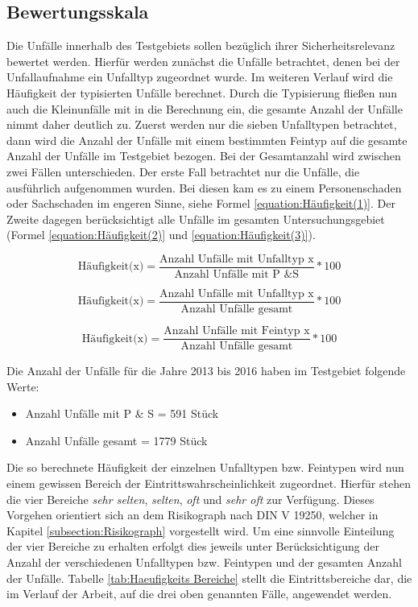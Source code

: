 \subsection{Bewertungsskala}\label{subsection:Bewertungsskala}
Die Unfälle innerhalb des Testgebiets sollen bezüglich ihrer Sicherheitsrelevanz bewertet werden. Hierfür werden zunächst die Unfälle betrachtet, denen bei der Unfallaufnahme ein Unfalltyp zugeordnet wurde. Im weiteren Verlauf wird die Häufigkeit der typisierten Unfälle berechnet. Durch die Typisierung fließen nun auch die Kleinunfälle mit in die Berechnung ein, die gesamte Anzahl der Unfälle nimmt daher deutlich zu. Zuerst werden nur die sieben Unfalltypen betrachtet, dann wird die Anzahl der Unfälle mit einem bestimmten Feintyp auf die gesamte Anzahl der Unfälle im Testgebiet bezogen. Bei der Gesamtanzahl wird zwischen zwei Fällen unterschieden. Der erste Fall betrachtet nur die Unfälle, die ausführlich aufgenommen wurden. Bei diesen kam es zu einem Personenschaden oder Sachschaden im engeren Sinne, siehe Formel \ref{equation:Häufigkeit(1)}. Der Zweite dagegen berücksichtigt alle Unfälle im gesamten Untersuchungsgebiet (Formel \ref{equation:Häufigkeit(2)} und \ref{equation:Häufigkeit(3)}).

\begin{equation}\label{equation:Häufigkeit(1)}
\text{Häufigkeit(x)} = \dfrac{\text{Anzahl Unfälle mit Unfalltyp x}}{\text{Anzahl Unfälle mit P \& S}}*100
\end{equation}

\begin{equation}\label{equation:Häufigkeit(2)}
\text{Häufigkeit(x)} = \dfrac{\text{Anzahl Unfälle mit Unfalltyp x}}{\text{Anzahl Unfälle gesamt}}*100
\end{equation}

\begin{equation}\label{equation:Häufigkeit(3)}
\text{Häufigkeit(x)} = \dfrac{\text{Anzahl Unfälle mit Feintyp x}}{\text{Anzahl Unfälle gesamt}}*100
\end{equation}

Die Anzahl der Unfälle für die Jahre 2013 bis 2016 haben im Testgebiet folgende Werte:

\begin{itemize}
	\item Anzahl Unfälle mit P \& S = 591 Stück
	\item Anzahl Unfälle gesamt = 1779 Stück
\end{itemize}

Die so berechnete Häufigkeit der einzelnen Unfalltypen bzw. Feintypen wird nun einem gewissen Bereich der Eintrittswahrscheinlichkeit zugeordnet. Hierfür stehen die vier Bereiche \textit{sehr selten}, \textit{selten}, \textit{oft} und \textit{sehr oft} zur Verfügung. Dieses Vorgehen orientiert sich an dem Risikograph nach DIN V 19250, welcher in Kapitel \ref{subsection:Risikograph} vorgestellt wird. Um eine sinnvolle Einteilung der  vier Bereiche zu erhalten erfolgt dies jeweils unter Berücksichtigung der Anzahl der verschiedenen Unfalltypen bzw. Feintypen und der gesamten Anzahl der Unfälle. Tabelle \ref{tab:Haeufigkeits Bereiche} stellt die Eintrittsbereiche dar, die im Verlauf der Arbeit, auf die drei oben genannten Fälle, angewendet werden.

